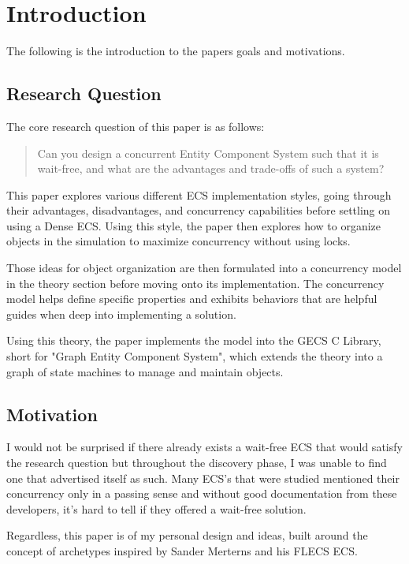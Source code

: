 \section{Introduction}

The following is the introduction to the papers goals and motivations.

\subsection{Research Question}

The core research question of this paper is as follows:

\blockquote{Can you design a concurrent Entity Component System such that it is wait-free, and what are the advantages and trade-offs of such a system?}

This paper explores various different ECS implementation styles, going through their advantages, disadvantages, and concurrency capabilities before settling on using a Dense ECS. Using this style, the paper then explores how to organize objects in the simulation to maximize concurrency without using locks. 

Those ideas for object organization are then formulated into a concurrency model in the theory section before moving onto its implementation. The concurrency model helps define specific properties and exhibits behaviors that are helpful guides when deep into implementing a solution. 

Using this theory, the paper implements the model into the GECS C Library, short for "Graph Entity Component System", which extends the theory into a graph of state machines to manage and maintain objects.

\subsection{Motivation}

I would not be surprised if there already exists a wait-free ECS that would satisfy the research question but throughout the discovery phase, I was unable to find one that advertised itself as such. Many ECS's that were studied mentioned their concurrency only in a passing sense and without good documentation from these developers, it's hard to tell if they offered a wait-free solution.

Regardless, this paper is of my personal design and ideas, built around the concept of archetypes inspired by Sander Merterns and his FLECS ECS.

